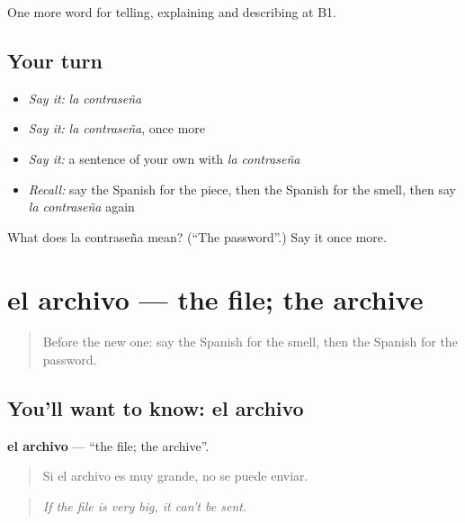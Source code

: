 \begin{grammarlens}[title={What you've built}]
One more word for telling, explaining and describing at B1.
\end{grammarlens}

\subsection*{Your turn}
\begin{itemize}
\raggedright
  \item \emph{Say it:} \emph{la contraseña}
  \item \emph{Say it:} \emph{la contraseña}, once more
  \item \emph{Say it:} a sentence of your own with \emph{la contraseña}
  \item \emph{Recall:} say the Spanish for the piece, then the Spanish for the smell, then say \emph{la contraseña} again
\end{itemize}

\begin{tcolorbox}[breakable,colback=teal!4,colframe=teal!35!black,title={Before you move on}]
What does la contraseña mean? (\textquotedblleft{}The password\textquotedblright{}.) Say it once more.
\end{tcolorbox}
\section[el archivo]{el archivo — the file; the archive}

\label{lesson:ES-C776-archivo}



\begin{quote}
Before the new one: say the Spanish for the smell, then the Spanish for the password.
\end{quote}

\subsection*{You'll want to know: el archivo}
\textbf{el archivo} — \textquotedblleft{}the file; the archive\textquotedblright{}.

\begin{quote}
Si el archivo es muy grande, no se puede enviar.
\end{quote}

\begin{quote}
\emph{If the file is very big, it can't be sent.}
\end{quote}

